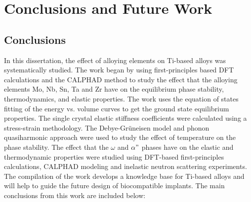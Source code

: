 \chapter{Conclusions and Future Work}

\section{Conclusions}


In this dissertation, the effect of alloying elements on Ti-based alloys was systematically studied. The work began by using first-principles based DFT calculations and the CALPHAD method to study the effect that the alloying elements Mo, Nb, Sn, Ta and Zr have on the equilibrium phase stability, thermodynamics, and elastic properties. The work uses the equation of states fitting of the energy vs. volume curves to get the ground state equilibrium properties. The single crystal elastic stiffness coefficients were calculated using a stress-strain methodology. The Debye-Gr\"uneisen model and phonon quasiharmonic approach were used to study the effect of temperature on the phase stability. The effect that the $\omega$ and $\alpha"$ phases have on the elastic and thermodynamic properties were studied using DFT-based first-principles calculations, CALPHAD modeling and inelastic neutron scattering experiments. The compilation of the work develops a knowledge base for Ti-based alloys and will help to guide the future design of biocompatible implants. The main conclusions from this work are included below:

